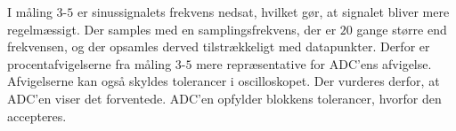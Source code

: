 I måling $3$-$5$ er sinussignalets frekvens nedsat, hvilket gør, at signalet bliver mere regelmæssigt. Der samples med en samplingsfrekvens, der er $20$ gange større end frekvensen, og der opsamles derved tilstrækkeligt med datapunkter. Derfor er procentafvigelserne fra måling $3$-$5$ mere repræsentative for ADC'ens afvigelse. Afvigelserne kan også skyldes tolerancer i oscilloskopet. Der vurderes derfor, at ADC'en viser det forventede. ADC'en opfylder blokkens tolerancer, hvorfor den accepteres.